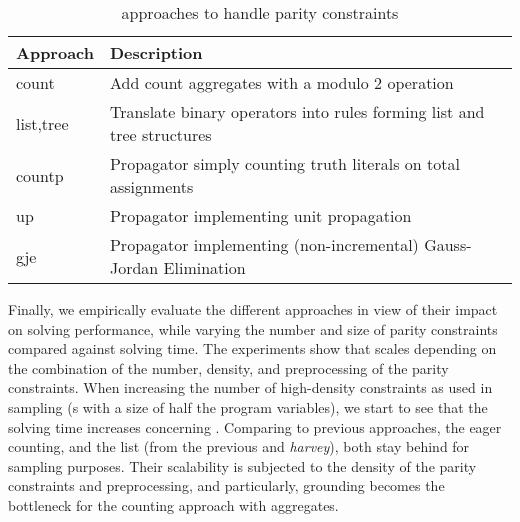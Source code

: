 \documentclass[letterpaper]{article} %
\begin{document}
 \begin{table}
 	\begin{tabular}{ l|l }
 		Approach  & Description  \\
 		\hline\hline
 		count     & Add count aggregates with a modulo 2 operation  \\  
 		list,tree & Translate binary \XOR{} operators into rules forming list and tree structures \\
 		countp    & Propagator simply counting truth literals on total assignments\\
 		up        & Propagator implementing unit propagation\\
 		gje       & Propagator implementing (non-incremental) Gauss-Jordan Elimination
 		
 	\end{tabular}
 	\caption{\xorro{} approaches to handle parity constraints}\label{table:xorro_approaches}
 	\vspace{-7mm}
 \end{table}
 Finally, we empirically evaluate the different approaches in view of their impact on solving performance,
 while varying the number and size of parity constraints compared against \clingo{} solving time.
 The experiments show that \xorro{} scales depending on the combination of the number, density, and preprocessing of the parity constraints.
 When increasing the number of high-density constraints as used in sampling (\XOR{}s with a size of half the program variables), we start to see that the solving time increases concerning \clingo.
 Comparing to previous approaches, the eager counting, and the list (from the previous \xorro{} and \emph{harvey}), both stay behind for sampling purposes. Their scalability is subjected to the density of the parity constraints and preprocessing, and particularly, grounding becomes the bottleneck for the counting approach with aggregates.
 
 
%


%
%
\end{document}
